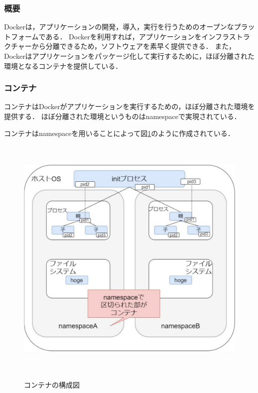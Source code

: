 \subsubsection{概要}
Docker\cite{docker}は，アプリケーションの開発，導入，実行を行うためのオープンなプラットフォームである．
Dockerを利用すれば，アプリケーションをインフラストラクチャーから分離できるため，ソフトウェアを素早く提供できる．
また，Dockerはアプリケーションをパッケージ化して実行するために，ほぼ分離された環境となるコンテナを提供している．

\subsubsection{コンテナ}\label{sec:container}
コンテナはDockerがアプリケーションを実行するための，ほぼ分離された環境を提供する．
ほぼ分離された環境というものはnamespace\cite{namespace}で実現されている．

コンテナはnamespaceを用いることによって図\ref{namespace}のように作成されている．

\begin{figure}[htbp]
    \begin{center}
        \includegraphics[width=13cm,height=12cm,keepaspectratio]{namespace-crop.pdf}\\
    \end{center}
    \caption{コンテナの構成図}
    \label{namespace}
\end{figure}

